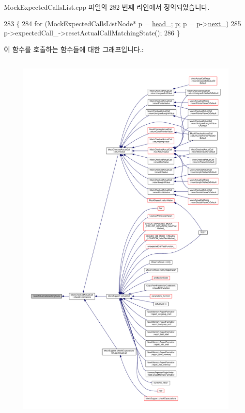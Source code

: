 Mock\+Expected\+Calls\+List.\+cpp 파일의 282 번째 라인에서 정의되었습니다.


\begin{DoxyCode}
283 \{
284     \textcolor{keywordflow}{for} (MockExpectedCallsListNode* p = \hyperlink{class_mock_expected_calls_list_a18290c3c0a206882dd8e0d9f446e2fe6}{head\_}; p; p = p->\hyperlink{class_mock_expected_calls_list_1_1_mock_expected_calls_list_node_aaae452a372ae14c06a6d5d252df73725}{next\_})
285         p->expectedCall\_->resetActualCallMatchingState();
286 \}
\end{DoxyCode}


이 함수를 호출하는 함수들에 대한 그래프입니다.\+:
\nopagebreak
\begin{figure}[H]
\begin{center}
\leavevmode
\includegraphics[height=550pt]{class_mock_expected_calls_list_a4c7ee87e12972e0504de732ae6f90177_icgraph}
\end{center}
\end{figure}



